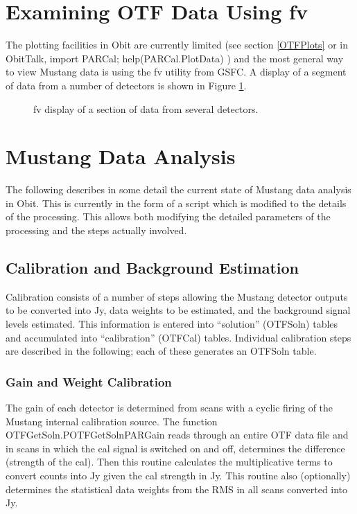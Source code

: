 \documentclass[11pt]{report}
\begin{document}
\section{Examining OTF Data Using fv}
The plotting facilities in Obit are currently limited 
(see section \ref{OTFPlots} or in ObitTalk, import PARCal; help(PARCal.PlotData) ) 
and the most general way to view Mustang data is using the fv utility from
GSFC. 
A display of a segment of data from a number of detectors is shown in
Figure \ref{fvOTFdata}.
\begin{figure}
\centerline{}
\caption{ 
fv display of a section of data from several detectors.
}
\label{fvOTFdata}
\end{figure}


\section{Mustang Data Analysis}
The following describes in some detail the current state of Mustang
data analysis in Obit.
This is currently in the form of a script which is modified to the
details of the processing.
This allows both modifying the detailed parameters of the processing
and the steps actually involved.

\subsection{Calibration and Background Estimation}
Calibration consists of a number of steps allowing the Mustang
detector outputs to be converted into Jy, data weights to be
estimated, and the background signal levels estimated.
This information is entered into ``solution'' (OTFSoln) tables and
accumulated into ``calibration'' (OTFCal) tables.
Individual calibration steps are described in the following; each of
these generates an OTFSoln table.

\subsubsection{Gain and Weight Calibration}
The gain of each detector is determined from scans with a cyclic
firing of the Mustang internal calibration source.
The function OTFGetSoln.POTFGetSolnPARGain reads through an entire OTF
data file and in scans in which the cal signal is switched on and off,
determines the difference (strength of the cal).
Then this routine calculates the multiplicative terms to convert
counts into Jy given the cal strength in Jy.
This routine also (optionally) determines the statistical data weights
from the RMS in all scans converted into Jy.
\end{document}
